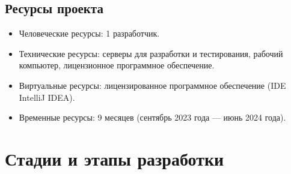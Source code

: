 \documentclass{article}
\begin{document}
    \subsection{Ресурсы проекта}
    \begin{itemize}
        \item Человеческие ресурсы: 1 разработчик.
        \item Технические ресурсы: серверы для разработки и тестирования, рабочий компьютер, лицензионное программное обеспечение.
        \item Виртуальные ресурсы: лицензированное программное обеспечение (IDE IntelliJ IDEA).
        \item Временные ресурсы: 9 месяцев (сентябрь 2023 года — июнь 2024 года).
    \end{itemize}
    \newpage
    \section {Стадии и этапы разработки}
\end{document}
